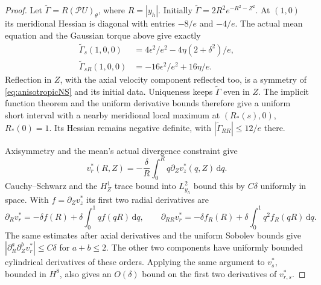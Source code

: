 \documentclass[11pt]{article}
\theoremstyle{remark}
\newcommand{\PP}{\mathcal P}
\newcommand{\dd}{\,\mathrm d}
\begin{document}
\begin{proof}
Let $\widetilde\Gamma=R(\PP U)_\theta$, where $R=|y_h|$.
Initially $\widetilde\Gamma=2R^2e^{-R^2-Z^2}$. At $(1,0)$ its
meridional Hessian is diagonal with entries $-8/e$ and $-4/e$.
The actual mean equation and the Gaussian torque above give exactly
\begin{align*}
 \widetilde\Gamma_s(1,0,0)
       &=4\epsilon^2/e^2-4\eta(2+\delta^2)/e,\\
 \widetilde\Gamma_{sR}(1,0,0)
       &=-16\epsilon^2/e^2+16\eta/e.
\end{align*}
Reflection in $Z$, with the axial velocity component reflected too,
is a symmetry of \eqref{eq:anisotropicNS} and its initial data.
Uniqueness keeps $\widetilde\Gamma$ even in $Z$.
The implicit function theorem and the uniform derivative bounds
therefore give a uniform short interval with a nearby meridional
local maximum at $(R_*(s),0)$, $R_*(0)=1$. Its Hessian remains
negative definite, with $|\widetilde\Gamma_{RR}|\leq12/e$ there.

Axisymmetry and the mean's actual divergence constraint give
\[
 v^*_r(R,Z)=-\frac\delta R\int_0^R q\partial_Zv^*_z(q,Z)\dd q.
\]
Cauchy--Schwarz and the $H^1_Z$ trace bound into $L^2_{y_h}$
bound this by $C\delta$ uniformly in space. With
$f=\partial_Zv^*_z$ its first two radial derivatives are
\[
 \partial_Rv^*_r=-\delta f(R)+\delta\int_0^1qf(qR)\dd q,
 \qquad
 \partial_{RR}v^*_r=-\delta f_R(R)
                              +\delta\int_0^1q^2f_R(qR)\dd q.
\]
The same estimates after axial derivatives and the uniform Sobolev
bounds give $|\partial_R^a\partial_Z^b v^*_r|\leq C\delta$
for $a+b\leq2$. The other two components have uniformly bounded
cylindrical derivatives of these orders. Applying the same argument
to $v^*_s$, bounded in $H^8$, also gives an $O(\delta)$ bound on
the first two derivatives of $v^*_{r,s}$.


\end{proof}
\end{document}
